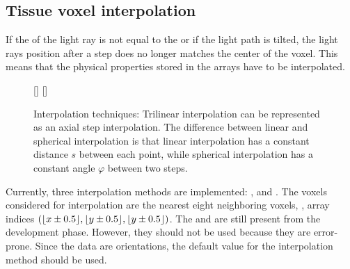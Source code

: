 \subsection{Tissue voxel interpolation}
%
If the \Stepsize{} of the light ray is not equal to the \Voxelsize{} or if the light path is tilted, the light rays position after a step does no longer matches the center of the voxel.
This means that the physical properties stored in the arrays have to be interpolated.
%
\begin{figure}[!t]
\centering
\setlength{\tikzwidth}{0.475\textwidth}
[\tikzwidth]{
\hfill{}\hfill}\hfill
{}
[\tikzwidth]{
}
\caption{Interpolation techniques: Trilinear interpolation can be represented as an axial step interpolation. The difference between linear and spherical interpolation is that linear interpolation has a constant distance $s$ between each point, while spherical interpolation has a constant angle $\varphi$ between two steps.}
\label{fig:vectorfield_disc}
\end{figure}
%
Currently, three interpolation methods are implemented: ,  and .
The voxels considered for interpolation are the nearest eight neighboring voxels, \ie{}, array indices $(\lfloor x\pm0.5\rfloor,\lfloor y\pm0.5\rfloor,\lfloor y\pm0.5\rfloor)$.
The  and  are still present from the development phase.
However, they should not be used because they are error-prone.
Since the data are orientations, the default value for the interpolation method  should be used.
%
%
%
